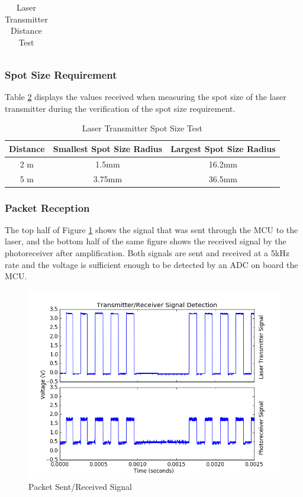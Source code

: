 \documentclass[letterpaper,10pt]{article}
\begin{document}
\begin{spacing}{1.15}
\begin{table}[htbp]
\begin{tabular}{c|c|c}
		\bottomrule	%
	\end{tabular}%
	\caption{Laser Transmitter Distance Test}
	\label{tab:distance-requirement}	%
\end{table}%

\subsubsection{Spot Size Requirement}
Table \ref{tab:spot-size} displays the values received when measuring the spot size of the laser transmitter during the verification of the spot size requirement. 
\begin{table}[htbp]
	\centering
	\begin{tabular}{c|c|c}	%
		\toprule	%
		Distance & Smallest Spot Size Radius & Largest Spot Size Radius \\
		\midrule
		2 m  & 1.5mm & 16.2mm\\
		5 m & 3.75mm & 36.5mm\\
		\bottomrule	%
	\end{tabular}%
	\caption{Laser Transmitter Spot Size Test}
	\label{tab:spot-size}
\end{table}%

\subsubsection{Packet Reception}
The top half of Figure \ref{fig:packet-verification} shows the signal that was sent through the MCU to the laser, and the bottom half of the same figure shows the received signal by the photoreceiver after amplification. Both signals are sent and received at a 5kHz rate and the voltage is sufficient enough to be detected by an ADC on board the MCU. 
\begin{figure} [H]
	\centering
	\includegraphics[scale=0.45]{packet_verification.png}
	\caption{Packet Sent/Received Signal\label{fig:packet-verification}}
\end{figure}


\end{spacing}
\end{document}
